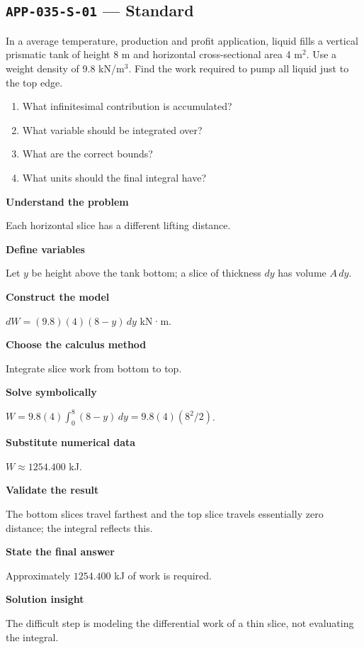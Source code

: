 \documentclass[11pt]{book}
\newcommand{\pid}[1]{\texttt{#1}}
\begin{document}
\subsection*{\pid{APP-035-S-01} — Standard}
\begin{problembox}
In a average temperature, production and profit application, liquid fills a vertical prismatic tank of height 8 m and horizontal cross-sectional area 4 m$^2$. Use a weight density of 9.8 kN/m$^3$. Find the work required to pump all liquid just to the top edge.
\end{problembox}
\begin{promptbox}\begin{enumerate}
\item What infinitesimal contribution is accumulated?
\item What variable should be integrated over?
\item What are the correct bounds?
\item What units should the final integral have?
\end{enumerate}\end{promptbox}
\begin{solutionbox}
\textbf{Understand the problem}\par Each horizontal slice has a different lifting distance.\par\medskip
\textbf{Define variables}\par Let $y$ be height above the tank bottom; a slice of thickness $dy$ has volume $A\,dy$.\par\medskip
\textbf{Construct the model}\par $dW=(9.8)(4)(8-y)\,dy$ kN·m.\par\medskip
\textbf{Choose the calculus method}\par Integrate slice work from bottom to top.\par\medskip
\textbf{Solve symbolically}\par $W=9.8(4)\int_0^{8}(8-y)\,dy=9.8(4)(8^2/2)$.\par\medskip
\textbf{Substitute numerical data}\par $W\approx 1254.400$ kJ.\par\medskip
\textbf{Validate the result}\par The bottom slices travel farthest and the top slice travels essentially zero distance; the integral reflects this.\par\medskip
\textbf{State the final answer}\par Approximately $1254.400$ kJ of work is required.\par\medskip
\textbf{Solution insight}\par The difficult step is modeling the differential work of a thin slice, not evaluating the integral.\par\medskip
\end{solutionbox}
\end{document}
